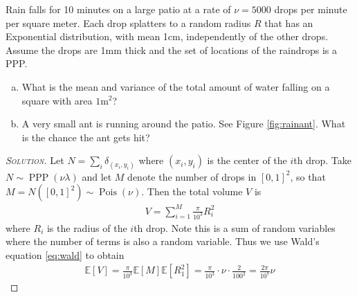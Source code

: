 \documentclass[11pt]{article}
\newenvironment{soln}{\begin{proof}[\textsc{Solution}]}{\renewcommand{\qedsymbol}{$\blacklozenge$}\end{proof}}
\begin{document}
\begin{example}\label{ex:ant}
	Rain falls for 10 minutes on a large patio at a rate of $\nu = 5000$ drops per minute per square meter. Each drop splatters to a random radius $R$ that has an Exponential distribution, with mean 1cm, independently of the other drops. Assume the drops are 1mm thick and the set of locations of the raindrops is a PPP.
	\begin{enumerate}[(a)]
		\item What is the mean and variance of the total amount of water falling on a square with area $1 \text{m}^2$?
		\item A very small ant is running around the patio. See Figure \ref{fig:rainant}. What is the chance the ant gets hit?
	\end{enumerate}

\begin{soln}
	Let $N = \sum_i \delta_{(x_i,y_i)}$ where $(x_i,y_i)$ is the center of the $i$th drop. Take $N \sim \operatorname{PPP}(\nu \lambda)$ and let $M$ denote the number of drops in $[0,1]^2$, so that $M = N([0,1]^2) \sim \operatorname{Pois}(\nu)$. Then the total volume $V$ is 
	\begin{align}
		V = \sum_{i=1}^M \frac{\pi}{10^3}R_i^2
	\end{align}
	where $R_i$ is the radius of the $i$th drop. Note this is a sum of random variables where the number of terms is also a random variable. Thus we use Wald's equation \eqref{eq:wald} to obtain
	\begin{align}\label{eq:usewald}
		\mathbb{E}\left[ V \right] = \frac{\pi}{10^3}\mathbb{E}[M]\mathbb{E}[R_1^2] = \frac{\pi}{10^3}\cdot \nu \cdot \frac{2}{100^2} = \frac{2\pi}{10^7}\nu
	\end{align}
	

\end{soln}
\end{example}
\end{document}
